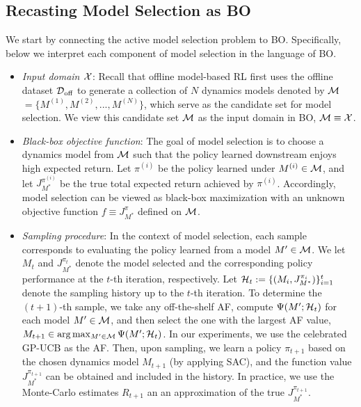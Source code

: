 \subsection{Recasting Model Selection as BO}
\label{sec:boms:framework}
\vspace{-1mm}
We start by connecting the active model selection problem to BO. Specifically, below we interpret each component of model selection in the language of BO.
\vspace{-1mm}
\begin{itemize}[leftmargin=*]
    \item \textit{Input domain $\operatorname{\mathcal{X}}$}: Recall that offline model-based RL first uses the offline dataset $\operatorname{\mathcal{D}}_{\text{off}}$ to generate a collection of ${N}$ dynamics models denoted by $\operatorname{\mathcal{M}}$ ${= \{M^{(1)}, M^{(2)}, ..., M^{(N)}\}}$, which serve as the candidate set for model selection. We view this candidate set $\operatorname{\mathcal{M}}$ as the input domain in BO, \ie $\operatorname{\mathcal{M}}\equiv \operatorname{\mathcal{X}}$.
    \item \textit{Black-box objective function}: The goal of model selection is to choose a dynamics model from $\operatorname{\mathcal{M}}$ such that the policy learned downstream enjoys high expected return. Let $\pi^{(i)}$ be the policy learned under $M^{(i)}\in \operatorname{\mathcal{M}}$, and let $J_{M^*}^{\pi^{(i)}}$ be the true total expected return achieved by $\pi^{(i)}$. Accordingly, model selection can be viewed as black-box maximization with an unknown objective function $f \equiv J^{\pi}_{M^*}$ defined on $\operatorname{\mathcal{M}}$.
    \item \textit{Sampling procedure}: In the context of model selection, each sample corresponds to evaluating the policy learned from a model $M'\in \operatorname{\mathcal{M}}$. We let $M_t$ and $J^{\pi_t}_{M^*}$ denote the model selected and the corresponding policy performance at the $t$-th iteration, respectively. Let $\operatorname{\mathcal{H}}_t:=\{(M_i,J^{\pi_i}_{M^*})\}_{i=1}^{t}$ denote the sampling history up to the $t$-th iteration. To determine the $(t+1)$-th sample, we take any off-the-shelf AF, compute $\Psi(M'; \operatorname{\mathcal{H}}_t)$ for each model $M'\in \operatorname{\mathcal{M}}$, and then select the one with the largest AF value, \ie $M_{t+1}\in \arg\max_{M'\in \operatorname{\mathcal{M}}} \Psi(M'; \operatorname{\mathcal{H}}_t)$. 
    In our experiments, we use the celebrated GP-UCB \citep{srinivas2012information} as the AF.
    Then, upon sampling, we learn a policy $\pi_{t+1}$ based on the chosen dynamics model $M_{t+1}$ (\eg by applying SAC), and the function value $J^{\pi_{t+1}}_{M^*}$ can be obtained and included in the history. In practice, we use the Monte-Carlo estimates $R_{t+1}$ an an approximation of the true $J^{\pi_{t+1}}_{M^*}$.

\end{itemize}

